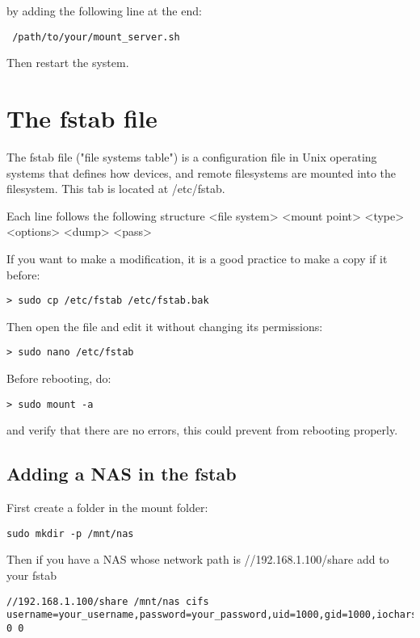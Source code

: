 \documentclass[24pt]{article}
\begin{document}
by adding the following line at the end: 

\begin{lstlisting}
 /path/to/your/mount_server.sh  
\end{lstlisting}

Then restart the system.


\section{The fstab file}

The fstab file ("file systems table") is a configuration file in Unix operating systems that defines how devices, and remote filesystems are mounted into the filesystem. This tab is located at /etc/fstab. 

Each line follows the following structure 
<file system> <mount point> <type> <options> <dump> <pass>
 
 
If you want to make a modification, it is a good practice to make a copy if it before:

\begin{lstlisting}
> sudo cp /etc/fstab /etc/fstab.bak
\end{lstlisting}
 
Then open the file and edit it without changing its permissions:

\begin{lstlisting}
> sudo nano /etc/fstab
\end{lstlisting}

 
 
 
Before rebooting, do:
\begin{lstlisting}
> sudo mount -a
\end{lstlisting}
and verify that there are no errors, this could prevent from rebooting properly.
 
 
\subsection{Adding a NAS in the fstab} 
 
First create a folder in the mount folder: 
\begin{lstlisting}
sudo mkdir -p /mnt/nas
\end{lstlisting}

Then if you have a NAS  whose network path is //192.168.1.100/share add to your fstab
 
\begin{lstlisting}
//192.168.1.100/share /mnt/nas cifs username=your_username,password=your_password,uid=1000,gid=1000,iocharset=utf8 0 0
\end{lstlisting}


 


  

 







\end{document}
